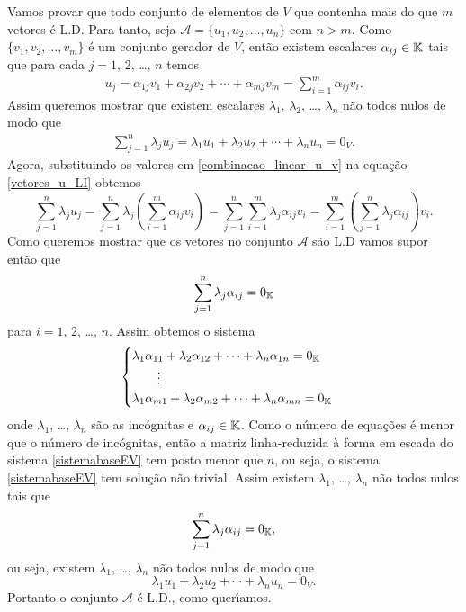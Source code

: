 \begin{prova}
	Vamos provar que todo conjunto de elementos de $V$ que contenha mais do que $m$ vetores \'e L.D. Para tanto, seja $\mathcal{A} = \{u_1, u_2, \dots, u_n\}$ com $n > m$. Como $\{v_1, v_2, \dots, v_m\}$ \'e um conjunto gerador de $V$, ent\~ao existem escalares $\alpha_{ij} \in \mathbb{K}$ tais que para cada $j = 1$, 2, \dots, $n$ temos
	\begin{align}\label{combinacao_linear_u_v}
		u_j = \alpha_{1j}v_1 + \alpha_{2j}v_2 + \cdots + \alpha_{mj}v_m = \sum_{i = 1}^m\alpha_{ij}v_i.
	\end{align}
	Assim queremos mostrar que existem escalares $\lambda_1$, $\lambda_2$, \dots, $\lambda_n$ n\~ao todos nulos de modo que
	\begin{align}\label{vetores_u_LI}
		\sum_{j = 1}^n \lambda_ju_j = \lambda_1 u_1 + \lambda_2 u_2 + \cdots + \lambda_n u_n = 0_V.
	\end{align}
	Agora, substituindo os valores em \eqref{combinacao_linear_u_v} na equa\c{c}\~ao \eqref{vetores_u_LI} obtemos
	\[
		\sum_{j = 1}^n\lambda_ju_j = \sum_{j = 1}^n\lambda_j\left(\sum_{i = 1}^m\alpha_{ij}v_i\right) = \sum_{j = 1}^n\sum_{i = 1}^m\lambda_j\alpha_{ij}v_i = \sum_{i = 1}^m\left(\sum_{j = 1}^n\lambda_j\alpha_{ij}\right)v_i.
	\]
	Como queremos mostrar que os vetores no conjunto $\mathcal{A}$ s\~ao L.D vamos supor ent\~ao que
	\[
		\sum_{j = 1}^n\lambda_j\alpha_{ij} = 0_{\mathbb{K}}
	\]
	para $i = 1$, 2, \dots, $n$. Assim obtemos o sistema
	\begin{equation}\label{sistemabaseEV}
		\begin{cases}
			\lambda_1\alpha_{11} + \lambda_2\alpha_{12} + \cdots + \lambda_n\alpha_{1n} = 0_{\mathbb{K}}\\
			\qquad \vdots\\
			\lambda_1\alpha_{m1} + \lambda_2\alpha_{m2} + \cdots + \lambda_n\alpha_{mn} = 0_{\mathbb{K}}\\
		\end{cases}
	\end{equation}
	onde $\lambda_1$, \dots, $\lambda_n$ s\~ao as inc\'ognitas e $\alpha_{ij} \in \mathbb{K}$. Como o n\'umero de equa\c{c}\~oes \'e menor que o n\'umero de inc\'ognitas, ent\~ao a matriz linha-reduzida \`a forma em escada do sistema \eqref{sistemabaseEV} tem posto menor que $n$, ou seja, o sistema \eqref{sistemabaseEV} tem solu\c{c}\~ao n\~ao trivial. Assim existem $\lambda_1$, \dots, $\lambda_n$ n\~ao todos nulos tais que
	\[
		\sum_{j = 1}^n\lambda_j\alpha_{ij} = 0_{\mathbb{K}},
	\]
	ou seja, existem $\lambda_1$, \dots, $\lambda_n$ n\~ao todos nulos de modo que
	\[
		\lambda_1 u_1 + \lambda_2 u_2 + \cdots + \lambda_n u_n = 0_V.
	\]
	Portanto o conjunto $\mathcal{A}$ \'e L.D., como quer{\'\i}amos.
\end{prova}

